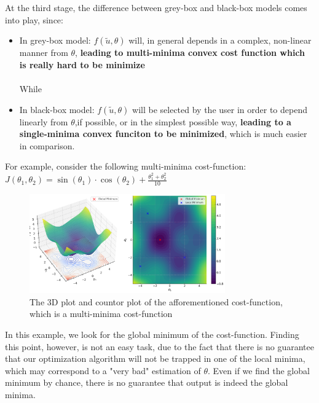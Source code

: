 \newpage
At the third stage, the difference between grey-box and black-box models comes into play, since:
\begin{itemize}
    \item In grey-box model: $f(\tilde{u},\theta)$ will, in general depends in a complex, non-linear manner from $\theta$, \textbf{leading to multi-minima convex cost function which is really hard to be minimize}\\ \\
    While\\
    \item In black-box model: $f(\tilde{u},\theta)$ will be selected by the user in order to depend linearly from $\theta$,if possible, or in the simplest possible way, \textbf{leading to a single-minima convex funciton to be minimized}, which is much easier in comparison. \\
\end{itemize}
For example, consider the following multi-minima cost-function: \\

\(
J(\theta_1, \theta_2) = \sin(\theta_1) \cdot \cos(\theta_2) + \frac{\theta_1^2 + \theta_2^2}{10}
\)

\begin{figure}[htbp]
    \centering
    \includegraphics[width=0.75\textwidth]{images/multi-minima-cost-function.png}
    \caption{The 3D plot and countor plot of the afforementioned cost-function, which is a multi-minima cost-function}
    \label{fig:multi-minima-cost-function}
\end{figure}

In this example, we look for the global minimum of the cost-function. Finding this point, however, is not an easy task, due to the fact that there is no guarantee that our optimization algorithm will not be trapped in one of the local minima, which may correspond to a "very bad" estimation of $\theta$. Even if we find the global minimum by chance, there is no guarantee that output is indeed the global minima.

